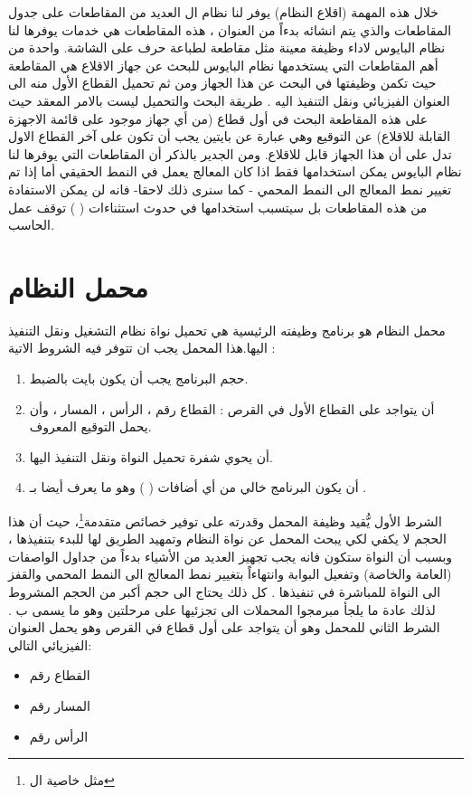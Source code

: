 \documentclass[document.tex]{subfiles}
\begin{document}
خلال هذه المهمة (اقلاع النظام) يوفر لنا نظام ال  العديد من المقاطعات على جدول المقاطعات والذي يتم انشائه بدءاً من العنوان  ، هذه المقاطعات هي خدمات يوفرها لنا نظام البايوس لاداء وظيفة معينة مثل مقاطعة لطباعة حرف على الشاشة.
واحدة من أهم المقاطعات التي يستخدمها نظام البايوس للبحث عن جهاز الاقلاع هي المقاطعة  حيث تكمن وظيفتها في البحث عن هذا الجهاز ومن ثم تحميل القطاع الأول منه الى العنوان الفيزيائي  ونقل التنفيذ اليه . طريقة البحث والتحميل ليست بالامر المعقد حيث على هذه المقاطعة البحث في أول قطاع (من أي جهاز موجود على قائمة الاجهزة القابلة للاقلاع) عن التوقيع  وهي عبارة عن بايتين يجب أن تكون على آخر القطاع الاول  تدل على أن هذا الجهاز قابل للاقلاع.
ومن الجدير بالذكر أن المقاطعات التي يوفرها لنا نظام البايوس يمكن استخدامها فقط اذا كان المعالج يعمل في النمط الحقيقي  أما إذا تم تغيير نمط المعالج الى النمط المحمي  - كما سنرى ذلك لاحقا- فانه لن يمكن الاستفادة من هذه المقاطعات بل سيتسبب استخدامها في حدوث استثناءات (  ) توقف عمل الحاسب.

\section{محمل النظام }
محمل النظام هو برنامج وظيفته الرئيسية هي تحميل نواة نظام التشغيل ونقل التنفيذ اليها.هذا المحمل يجب ان تتوفر فيه الشروط الاتية :

\begin{enumerate}
\item حجم البرنامج يجب أن يكون  بايت بالضبط.
\item أن يتواجد على القطاع الأول في القرص : القطاع رقم  ، الرأس  ، المسار  ، وأن يحمل التوقيع المعروف.
\item أن يحوي شفرة تحميل النواة ونقل التنفيذ اليها.
\item أن يكون البرنامج  خالي من أي أضافات (  ) وهو ما يعرف أيضا بـ  .

\end{enumerate}

الشرط الأول يُّقيد وظيفة المحمل وقدرته على توفير خصائص متقدمة\footnote{مثل خاصية ال  }، حيث أن هذا الحجم لا يكفي لكي يبحث المحمل عن نواة النظام وتمهيد الطريق لها للبدء بتنفيذها ، وبسبب أن النواة ستكون  فانه يجب تجهيز العديد من الأشياء بدءاً من جداول الواصفات (العامة والخاصة) وتفعيل البوابة  وانتهاءاً بتغيير نمط المعالج الى النمط المحمي والقفز الى النواة للمباشرة في تنفيذها . كل ذلك يحتاج الى حجم أكبر من الحجم المشروط لذلك عادة ما يلجأ مبرمجوا المحملات الى تجزئيها على مرحلتين وهو ما يسمى ب  .
الشرط الثاني للمحمل وهو أن يتواجد على أول قطاع في القرص وهو يحمل العنوان الفيزيائي التالي:
\begin{itemize}
\item القطاع رقم 
\item المسار رقم 
\item الرأس رقم 
\end{itemize}
\end{document}
